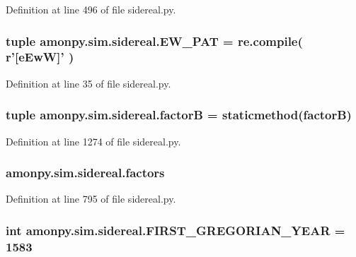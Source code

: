 Definition at line 496 of file sidereal.\-py.

\hypertarget{namespaceamonpy_1_1sim_1_1sidereal_ad7a8005369f4e3c771b42e5dadb008be}{
\subsubsection[{E\-W\-\_\-\-P\-A\-T}]{\setlength{\rightskip}{0pt plus 5cm}tuple amonpy.\-sim.\-sidereal.\-E\-W\-\_\-\-P\-A\-T = re.\-compile( r'\mbox{[}e\-Ew\-W\mbox{]}' )}}\label{namespaceamonpy_1_1sim_1_1sidereal_ad7a8005369f4e3c771b42e5dadb008be}


Definition at line 35 of file sidereal.\-py.

\hypertarget{namespaceamonpy_1_1sim_1_1sidereal_aae0094a33936985d23752c0b42ea411f}{
\subsubsection[{factor\-B}]{\setlength{\rightskip}{0pt plus 5cm}tuple amonpy.\-sim.\-sidereal.\-factor\-B = staticmethod(factor\-B)}}\label{namespaceamonpy_1_1sim_1_1sidereal_aae0094a33936985d23752c0b42ea411f}


Definition at line 1274 of file sidereal.\-py.

\hypertarget{namespaceamonpy_1_1sim_1_1sidereal_ab2edf7a627829f85f34e74fcdfe9cab3}{
\subsubsection[{factors}]{\setlength{\rightskip}{0pt plus 5cm}amonpy.\-sim.\-sidereal.\-factors}}\label{namespaceamonpy_1_1sim_1_1sidereal_ab2edf7a627829f85f34e74fcdfe9cab3}


Definition at line 795 of file sidereal.\-py.

\hypertarget{namespaceamonpy_1_1sim_1_1sidereal_a0507d81c344a5ca1691e575909282b29}{
\subsubsection[{F\-I\-R\-S\-T\-\_\-\-G\-R\-E\-G\-O\-R\-I\-A\-N\-\_\-\-Y\-E\-A\-R}]{\setlength{\rightskip}{0pt plus 5cm}int amonpy.\-sim.\-sidereal.\-F\-I\-R\-S\-T\-\_\-\-G\-R\-E\-G\-O\-R\-I\-A\-N\-\_\-\-Y\-E\-A\-R = 1583}}\label{namespaceamonpy_1_1sim_1_1sidereal_a0507d81c344a5ca1691e575909282b29}


